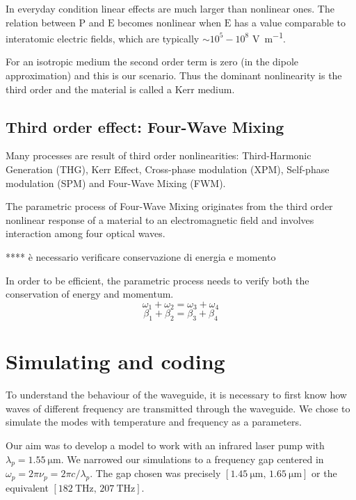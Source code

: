 \documentclass[12pt,a4paper,twoside]{article}
\begin{document}
In everyday condition linear effects are much larger than nonlinear ones.
The relation between $\mathrm{P}$ and $\mathrm{E}$ becomes nonlinear when $\mathrm{E}$ has a value comparable to interatomic electric fields, which are typically $\sim 10^5-10^8$ \si{\V\per\m}.

For an isotropic medium the second order term is zero (in the dipole approximation) and this is our scenario.
Thus the dominant nonlinearity is the third order and the material is called a Kerr medium.

\subsection{Third order effect: Four-Wave Mixing}
Many processes are result of third order nonlinearities: Third-Harmonic Generation (THG), Kerr Effect, Cross-phase modulation (XPM), Self-phase modulation (SPM) and Four-Wave Mixing (FWM).

The parametric process of Four-Wave Mixing originates from the third order nonlinear response of a material to an electromagnetic field and involves interaction among four optical waves.

\vspace{18pt}
****		è necessario verificare conservazione di energia e momento
\vspace{12pt}

In order to be efficient, the parametric process needs to verify both the conservation of energy and momentum.
\begin{equation}
\omega_1 + \omega_2 = \omega_3 + \omega_4
\end{equation}
\begin{equation}
\beta_1 + \beta_2 = \beta_3 + \beta_4
\end{equation}

\section{Simulating and coding}

To understand the behaviour of the waveguide, it is necessary to first know how waves of different frequency are transmitted through the waveguide.
We chose to simulate the modes with temperature and frequency as a parameters.

Our aim was to develop a model to work with an infrared laser pump with $\lambda_{p} = \SI{1.55}{\um}$.
We narrowed our simulations to a frequency gap centered in $\omega_p = 2\pi \nu_p = 2\pi c / \lambda_{p}$.
The gap chosen was precisely $[\SI{1.45}{\um} ,\, \SI{1.65}{\um}]$ or the equivalent $[\SI{182}{\THz} ,\, \SI{207}{\THz}]$.
\end{document}
